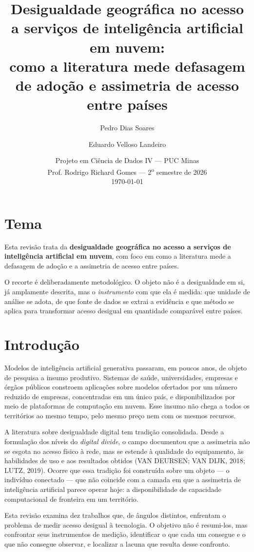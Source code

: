 \documentclass[12pt,a4paper]{article}
\title{\textbf{Desigualdade geográfica no acesso a serviços de inteligência
artificial em nuvem:}\\[0.3em]
\large como a literatura mede defasagem de adoção e assimetria de acesso entre países}
\author{Pedro Dias Soares \and Eduardo Velloso Landeiro}
\date{Projeto em Ciência de Dados IV --- PUC Minas\\
Prof. Rodrigo Richard Gomes --- 2\textsuperscript{o} semestre de 2026\\[0.5em]
\today}
\begin{document}
\maketitle

\section{Tema}

Esta revisão trata da \textbf{desigualdade geográfica no acesso a serviços de
inteligência artificial em nuvem}, com foco em como a literatura mede a defasagem de
adoção e a assimetria de acesso entre países.

O recorte é deliberadamente metodológico. O objeto não é a desigualdade em si, já
amplamente descrita, mas o \emph{instrumento} com que ela é medida: que unidade de
análise se adota, de que fonte de dados se extrai a evidência e que método se aplica
para transformar acesso desigual em quantidade comparável entre países.

\section{Introdução}

Modelos de inteligência artificial generativa passaram, em poucos anos, de objeto de
pesquisa a insumo produtivo. Sistemas de saúde, universidades, empresas e órgãos
públicos constroem aplicações sobre modelos ofertados por um número reduzido de
empresas, concentradas em um único país, e disponibilizados por meio de plataformas de
computação em nuvem. Esse insumo não chega a todos os territórios ao mesmo tempo, pelo
mesmo preço nem com os mesmos recursos.

A literatura sobre desigualdade digital tem tradição consolidada. Desde a formulação
dos níveis do \emph{digital divide}, o campo documentou que a assimetria não se esgota
no acesso físico à rede, mas se estende à qualidade do equipamento, às habilidades de
uso e aos resultados obtidos (VAN DEURSEN; VAN DIJK, 2018; LUTZ, 2019). Ocorre que essa tradição
foi construída sobre um objeto --- o indivíduo conectado --- que não coincide com a camada
em que a assimetria de inteligência artificial parece operar hoje: a disponibilidade
de capacidade computacional de fronteira em um território.

Esta revisão examina dez trabalhos que, de ângulos distintos, enfrentam o problema de
medir acesso desigual à tecnologia. O objetivo não é resumi-los, mas confrontar seus
instrumentos de medição, identificar o que cada um consegue e o que não consegue
observar, e localizar a lacuna que resulta desse confronto.
\end{document}
